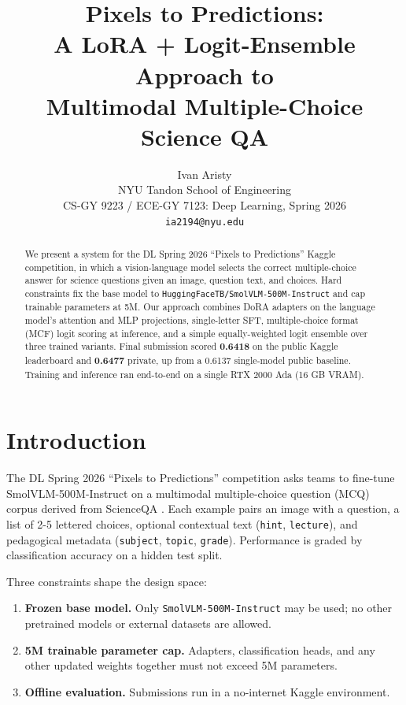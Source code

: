 \documentclass[11pt]{article}
\title{Pixels to Predictions: \\
A LoRA + Logit-Ensemble Approach to \\
Multimodal Multiple-Choice Science QA}
\author{Ivan Aristy \\
  NYU Tandon School of Engineering \\
  CS-GY 9223 / ECE-GY 7123: Deep Learning, Spring 2026 \\
  \texttt{ia2194@nyu.edu}}
\begin{document}
\maketitle
\sloppy

\begin{abstract}
We present a system for the DL Spring 2026 ``Pixels to Predictions'' Kaggle competition, in which a vision-language model selects the correct multiple-choice answer for science questions given an image, question text, and choices. Hard constraints fix the base model to \texttt{HuggingFaceTB/SmolVLM-500M-Instruct} and cap trainable parameters at 5M. Our approach combines DoRA adapters on the language model's attention and MLP projections, single-letter SFT, multiple-choice format (MCF) logit scoring at inference, and a simple equally-weighted logit ensemble over three trained variants. Final submission scored \textbf{0.6418} on the public Kaggle leaderboard and \textbf{0.6477} private, up from a 0.6137 single-model public baseline. Training and inference ran end-to-end on a single RTX 2000 Ada (16 GB VRAM).
\end{abstract}

\section{Introduction}

The DL Spring 2026 ``Pixels to Predictions'' competition asks teams to fine-tune SmolVLM-500M-Instruct \citep{smolvlm2024} on a multimodal multiple-choice question (MCQ) corpus derived from ScienceQA \citep{lu2022scienceqa}. Each example pairs an image with a question, a list of 2-5 lettered choices, optional contextual text (\texttt{hint}, \texttt{lecture}), and pedagogical metadata (\texttt{subject}, \texttt{topic}, \texttt{grade}). Performance is graded by classification accuracy on a hidden test split.

Three constraints shape the design space:

\begin{enumerate}
    \item \textbf{Frozen base model.} Only \texttt{SmolVLM-500M-Instruct} may be used; no other pretrained models or external datasets are allowed.
    \item \textbf{5M trainable parameter cap.} Adapters, classification heads, and any other updated weights together must not exceed 5M parameters.
    \item \textbf{Offline evaluation.} Submissions run in a no-internet Kaggle environment.
\end{enumerate}
\end{document}
